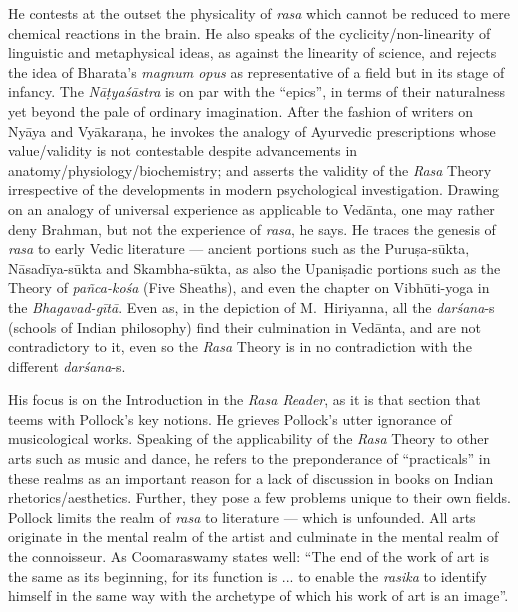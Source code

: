 He contests at the outset the physicality of \textsl{rasa} which cannot be reduced to mere chemical reactions in the brain. He also speaks of the cyclicity/non-linearity of linguistic and metaphysical ideas, as against the linearity of science, and rejects the idea of Bharata’s \textsl{magnum opus} as representative of a field but in its stage of infancy. The \textsl{Nāṭyaśāstra} is on par with the “epics”, in terms of their naturalness yet beyond the pale of ordinary imagination. After the fashion of writers on Nyāya and Vyākaraṇa, he invokes the analogy of Ayurvedic prescriptions whose value/validity is not contestable despite advancements in anatomy/physiology/biochemistry; and asserts the validity of the \textsl{Rasa} Theory irrespective of the developments in modern psychological investigation. Drawing on an analogy of universal experience as applicable to Vedānta, one may rather deny Brahman, but not the experience of \textsl{rasa}, he says. He traces the genesis of \textsl{rasa} to early Vedic literature --- ancient portions such as the Puruṣa-sūkta, Nāsadīya-sūkta and Skambha-sūkta, as also the Upaniṣadic portions such as the Theory of \textsl{pañca-kośa} (Five Sheaths), and even the chapter on Vibhūti-yoga in the \textsl{Bhagavad-gītā}. Even as, in the depiction of M.\ Hiriyanna, all the \textsl{darśana}-s (schools of Indian philosophy) find their culmination in Vedānta, and are not contradictory to it, even so the \textsl{Rasa} Theory is in no contradiction with the different \textsl{darśana}-s.

His focus is on the Introduction in the \textsl{Rasa Reader}, as it is that section that teems with Pollock’s key notions. He grieves Pollock’s utter ignorance of musicological works. Speaking of the applicability of the \textsl{Rasa} Theory to other arts such as music and dance, he refers to the preponderance of “practicals” in these realms as an important reason for a lack of discussion in books on Indian rhetorics/aesthetics. Further, they pose a few problems unique to their own fields. Pollock limits the realm of \textsl{rasa} to literature --- which is unfounded. All arts originate in the mental realm of the artist and culminate in the mental realm of the connoisseur. As Coomaraswamy states well: “The end of the work of art is the same as its beginning, for its function is ... to enable the \textsl{rasika} to identify himself in the same way with the archetype of which his work of art is an image”.

